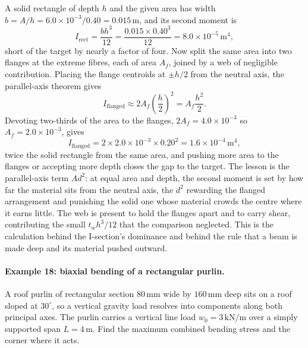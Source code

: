 A solid rectangle of depth $h$ and the given area has width $b = A/h =
6.0 \times 10^{-3}/0.40 = 0.015\,\si{\meter}$, and its second moment is
\[
I_{\text{rect}} = \frac{b h^3}{12} = \frac{0.015 \times 0.40^3}{12}
= 8.0 \times 10^{-5}\,\si{\meter\tothe{4}},
\]
short of the target by nearly a factor of four. Now split the same area
into two flanges at the extreme fibres, each of area $A_f$, joined by a
web of negligible contribution. Placing the flange centroids at $\pm h/2$
from the neutral axis, the parallel-axis theorem gives
\[
I_{\text{flanged}} \approx 2 A_f \left(\frac{h}{2}\right)^2
= A_f \frac{h^2}{2}.
\]
Devoting two-thirds of the area to the flanges, $2A_f = 4.0 \times 10^{-3}$
so $A_f = 2.0 \times 10^{-3}$, gives
\[
I_{\text{flanged}} = 2 \times 2.0 \times 10^{-3}\times 0.20^2
= 1.6 \times 10^{-4}\,\si{\meter\tothe{4}},
\]
twice the solid rectangle from the same area, and pushing more area to the
flanges or accepting more depth closes the gap to the target. The lesson
is the parallel-axis term $A d^2$: at equal area and depth, the second
moment is set by how far the material sits from the neutral axis, the
$d^2$ rewarding the flanged arrangement and punishing the solid one whose
material crowds the centre where it earns little. The web is present to
hold the flanges apart and to carry shear, contributing the small
$t_w h^3/12$ that the comparison neglected. This is the calculation behind
the I-section's dominance and behind the rule that a beam is made deep and
its material pushed outward.

\paragraph{Example 18: biaxial bending of a rectangular purlin.} A roof
purlin of rectangular section $80\,\si{\milli\meter}$ wide by
$160\,\si{\milli\meter}$ deep sits on a roof sloped at $30^{\circ}$, so a
vertical gravity load resolves into components along both principal axes.
The purlin carries a vertical line load $w_0 = 3\,\text{kN}/\text{m}$ over
a simply supported span $L = 4\,\si{\meter}$. Find the maximum combined
bending stress and the corner where it acts.

